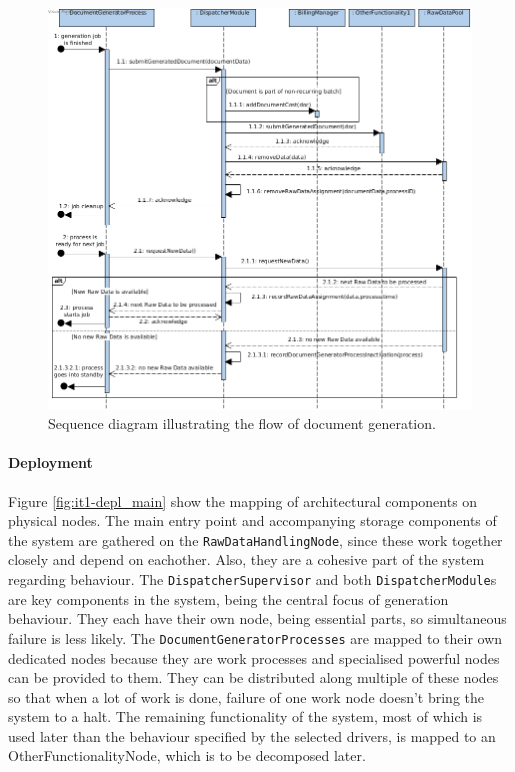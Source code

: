 \documentclass[a4paper,10pt]{article}
\begin{document}
\begin{figure}[!htp]
    \centering
    \includegraphics[width=\textwidth]{seq_diag_1_-_doc_gen.png}
    \caption{Sequence diagram illustrating the flow of document generation.}\label{fig:it1-seq_aspect1}
\end{figure}

\paragraph{Deployment}
Figure \ref{fig:it1-depl_main} show the mapping of architectural components on physical nodes.
The main entry point and accompanying storage components of the system are gathered on the \texttt{RawDataHandlingNode}, since these work together closely and depend on eachother. Also, they are a cohesive part of the system regarding behaviour. The \texttt{DispatcherSupervisor} and both \texttt{DispatcherModule}s are key components in the system, being the central focus of generation behaviour. They each have their own node, being essential parts, so simultaneous failure is less likely. The \texttt{DocumentGeneratorProcesses} are mapped to their own dedicated nodes because they are work processes and specialised powerful nodes can be provided to them. They can be distributed along multiple of these nodes so that when a lot of work is done, failure of one work node doesn't bring the system to a halt. The remaining functionality of the system, most of which is used later than the behaviour specified by the selected drivers, is mapped to an OtherFunctionalityNode, which is to be decomposed later.
\end{document}
